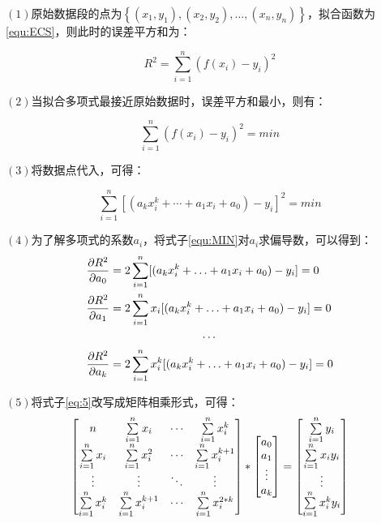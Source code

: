 $(1)$原始数据段的点为$\left \{ \left ( x_{1},y_{1} \right ),\left ( x_{2},y_{2} \right ),...,\left ( x_{n},y_{n} \right ) \right \}$，拟合函数为 \ref{equ:ECS}，则此时的误差平方和为：

\begin{equation}
R^2=\sum_{i=1}^n(f(x_i)-y_i)^2
\end{equation}

$(2)$当拟合多项式最接近原始数据时，误差平方和最小，则有：

 \begin{equation}
\sum_{i=1}^n(f(x_i)-y_i)^2 = min
\end{equation}

$(3)$将数据点代入，可得：

\begin{equation}
\sum_{i=1}^n[(a_kx_i^k+\cdots + a_1x_i+a_0)-y_i]^2 = min
\label{equ:MIN}\end{equation}

$(4)$为了解多项式的系数$a_{i}$，将式子\ref{equ:MIN}对$a_{i}$求偏导数，可以得到：
\begin{equation}\label{eq:5}
\begin{split}
\frac{\partial R^2}{\partial a_0} &=2\sum_{i=1}^n \limits [(a_kx_i^k+ \ldots + a_1x_i+a_0)-y_i] = 0 \\
\frac{\partial R^2}{\partial a_1} &=2\sum_{i=1}^n \limits x_i[(a_kx_i^k+ \ldots + a_1x_i+a_0)-y_i] = 0 \\
&\qquad \qquad \qquad \qquad \cdots \\
\frac{\partial R^2}{\partial a_k} &=2\sum_{i=1}^n \limits x_i^k[(a_kx_i^k+ \ldots + a_1x_i+a_0)-y_i] = 0 \\
\end{split}
\end{equation}

$(5)$将式子\ref{eq:5}改写成矩阵相乘形式，可得：
\begin{equation}\label{eq:6}
\begin{bmatrix}
n&{\sum_{i=1}^n \limits x_i}& \cdots & {\sum_{i=1}^n \limits x_i^k} \\
{\sum_{i=1}^n \limits x_i}&{\sum_{i=1}^n \limits x_i^2}& \cdots & {\sum_{i=1}^n \limits x_i^{k+1}}\\
\vdots & \vdots & \ddots & \vdots \\
{\sum_{i=1}^n \limits x_i^k}&{\sum_{i=1}^n \limits x_i^{k+1}}& \cdots & {\sum_{i=1}^n \limits x_i^{2*k}}
\end{bmatrix}*
\begin{bmatrix}
a_0 \\
a_1 \\
\vdots \\
a_k
\end{bmatrix}
=
\begin{bmatrix}
{\sum_{i=1}^n \limits y_i} \\
{\sum_{i=1}^n \limits x_iy_i} \\
\vdots \\
{\sum_{i=1}^n \limits x_i^ky_i}
\end{bmatrix}
\end{equation}

